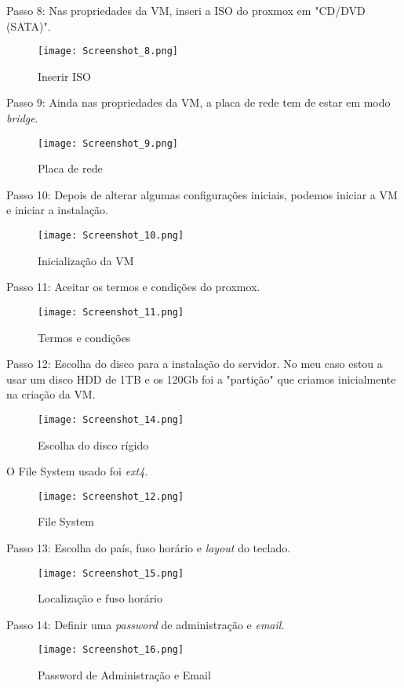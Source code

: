 \newpage
Passo 8: Nas propriedades da \ac{VM}, inseri a \ac{ISO} do proxmox em "\ac{CD/DVD} (\ac{SATA})".
\begin{figure}[H]
\center
\texttt{[image: Screenshot\_8.png]}
\caption{Inserir \ac{ISO}}
\end{figure}

Passo 9: Ainda nas propriedades da \ac{VM}, a placa de rede tem de estar em modo \textit{bridge}.
\begin{figure}[H]
\center
\texttt{[image: Screenshot\_9.png]}
\caption{Placa de rede}
\end{figure}

\newpage
Passo 10: Depois de alterar algumas configurações iniciais, podemos iniciar a \ac{VM} e iniciar a instalação.
\begin{figure}[H]
\center
\texttt{[image: Screenshot\_10.png]}
\caption{Inicialização da \ac{VM}}
\end{figure}

Passo 11: Aceitar os termos e condições do proxmox.
\begin{figure}[H]
\center
\texttt{[image: Screenshot\_11.png]}
\caption{Termos e condições}
\end{figure}

\newpage
Passo 12: Escolha do disco para a instalação do servidor. No meu caso estou a usar um disco \ac{HDD} de 1TB e os 120Gb foi a "partição" que criamos inicialmente na criação da \ac{VM}.
\begin{figure}[H]
\center
\texttt{[image: Screenshot\_14.png]}
\caption{Escolha do disco rígido}
\end{figure}

O File System usado foi \textit{ext4}.
\begin{figure}[H]
\center
\texttt{[image: Screenshot\_12.png]}
\caption{File System}
\end{figure}

\newpage
Passo 13: Escolha do país, fuso horário e \textit{layout} do teclado.
\begin{figure}[H]
\center
\texttt{[image: Screenshot\_15.png]}
\caption{Localização e fuso horário}
\end{figure}

Passo 14: Definir uma \textit{password} de administração e \textit{email}.
\begin{figure}[H]
\center
\texttt{[image: Screenshot\_16.png]}
\caption{Password de Administração e Email}
\end{figure}

